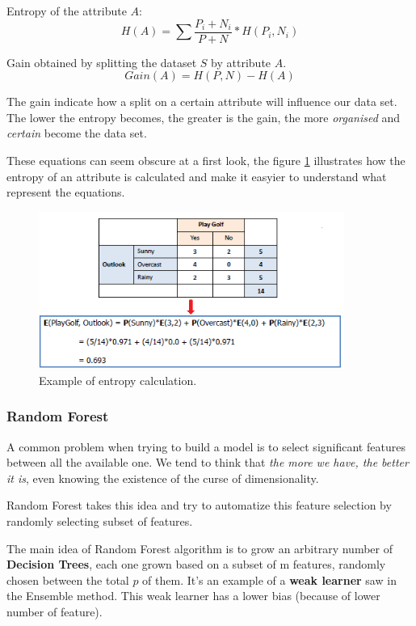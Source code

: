 Entropy of the attribute $A$:
$$
H(A) = \sum \frac{P_i + N_i}{P + N} * H(P_i, N_i)
$$

Gain obtained by splitting the dataset $S$ by attribute $A$.
$$
Gain(A) = H(P, N) - H(A)
$$

The gain indicate how a split on a certain attribute will influence our data set. The lower the entropy becomes, the greater is the gain, the more \textit{organised} and \textit{certain} become the data set.

These equations can seem obscure at a first look, the figure \ref{pic:entropy} illustrates how the entropy of an attribute is calculated and make it easyier to understand what represent the equations.


\begin{figure}[H]%
 \centering
 \includegraphics[width=10cm]{./img/07/entropy.png}
 \caption{\label{pic:entropy} Example of entropy calculation.}
\end{figure}






\subsubsection{Random Forest}

A common problem when trying to build a model is to select significant features between all the available one. We tend to think that \textit{the more we have, the better it is}, even knowing the existence of the curse of dimensionality. 

Random Forest takes this idea and try to automatize this feature selection by randomly selecting subset of features.

The main idea of Random Forest algorithm is to grow an arbitrary number of \textbf{Decision Trees}, each one grown based on a subset of m features, randomly chosen between the total $p$ of them. It's an example of a \textbf{weak learner} saw in the Ensemble method. This weak learner has a lower bias (because of lower number of feature).

